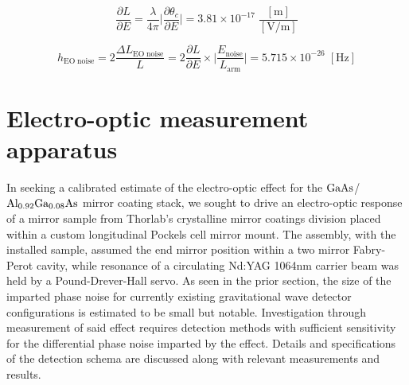 \begin{equation*}
    \frac{\partial L}{\partial E} = \frac{\lambda}{4 \pi} \bigg| \frac{\partial \theta_c}{\partial E} \bigg| = 3.81 \times 10^{-17} \; \frac{[\mathrm{m}]}{[\mathrm{V/m}]}
\end{equation*}

\begin{equation}
    h_\mathrm{EO\; noise} = 2\frac{\Delta L_\mathrm{EO \; noise}}{L} = 2\frac{\partial L}{\partial E} \times \bigg| \frac{E_\mathrm{noise}}{L_\mathrm{arm}} \bigg| = 5.715 \times 10^{-26} \; \mathrm{[Hz]}
\end{equation}




\section{Electro-optic measurement apparatus}
In seeking a calibrated estimate of the electro-optic effect for the $\mathrm{GaAs}$/$\mathrm{Al_{0.92}Ga_{0.08}As}$ mirror coating stack, we sought to drive an electro-optic response of a mirror sample from Thorlab's crystalline mirror coatings division placed within a custom longitudinal Pockels cell mirror mount. The assembly, with the installed sample, assumed the end mirror position within a two mirror Fabry-Perot cavity, while resonance of a circulating Nd:YAG 1064nm carrier beam was held by a Pound-Drever-Hall servo. As seen in the prior section, the size of the imparted phase noise for currently existing gravitational wave detector configurations is estimated to be small but notable. Investigation through measurement of said effect requires detection methods with sufficient sensitivity for the differential phase noise imparted by the effect. Details and specifications of the detection schema are discussed along with relevant measurements and results. 



